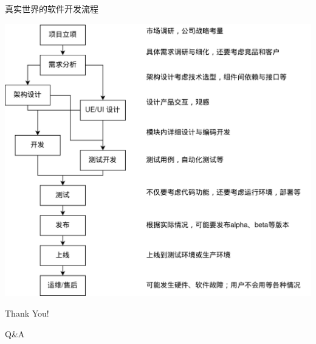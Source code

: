 \documentclass{beamer}
\begin{document}
\begin{frame}[label={sec:org4a4c1ab}]{真实世界的软件开发流程}
\begin{center}
\includegraphics[height=0.9\textheight]{../assets/static/opensource/workflow.png}
\end{center}
\end{frame}

\begin{frame}[label={sec:org7b57a75}]{}
\begin{center}
\Huge Thank You!
\end{center}
\end{frame}

\begin{frame}[label={sec:org26c43b0}]{}
\begin{center}
\Huge Q\&A
\end{center}
\end{frame}
\end{document}
